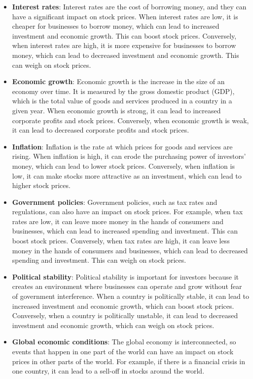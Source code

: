 \begin{itemize}
\item \textbf{Interest rates}: Interest rates are the cost of borrowing money, and they can have a significant impact on stock prices. When interest rates are low, it is cheaper for businesses to borrow money, which can lead to increased investment and economic growth. This can boost stock prices. Conversely, when interest rates are high, it is more expensive for businesses to borrow money, which can lead to decreased investment and economic growth. This can weigh on stock prices.
\item \textbf{Economic growth}: Economic growth is the increase in the size of an economy over time. It is measured by the gross domestic product (GDP), which is the total value of goods and services produced in a country in a given year. When economic growth is strong, it can lead to increased corporate profits and stock prices. Conversely, when economic growth is weak, it can lead to decreased corporate profits and stock prices.
\item \textbf{Inflation}: Inflation is the rate at which prices for goods and services are rising. When inflation is high, it can erode the purchasing power of investors' money, which can lead to lower stock prices. Conversely, when inflation is low, it can make stocks more attractive as an investment, which can lead to higher stock prices.
\item \textbf{Government policies}: Government policies, such as tax rates and regulations, can also have an impact on stock prices. For example, when tax rates are low, it can leave more money in the hands of consumers and businesses, which can lead to increased spending and investment. This can boost stock prices. Conversely, when tax rates are high, it can leave less money in the hands of consumers and businesses, which can lead to decreased spending and investment. This can weigh on stock prices.
\item \textbf{Political stability}: Political stability is important for investors because it creates an environment where businesses can operate and grow without fear of government interference. When a country is politically stable, it can lead to increased investment and economic growth, which can boost stock prices. Conversely, when a country is politically unstable, it can lead to decreased investment and economic growth, which can weigh on stock prices.
\item \textbf{Global economic conditions}: The global economy is interconnected, so events that happen in one part of the world can have an impact on stock prices in other parts of the world. For example, if there is a financial crisis in one country, it can lead to a sell-off in stocks around the world.
\end{itemize}

